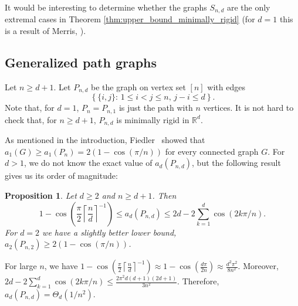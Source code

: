 \documentclass[a4paper,11pt]{article}
\theoremstyle{plain}
\newtheorem{proposition}[theorem]{\bf Proposition}
\theoremstyle{definition}
\newcommand{\Rea}{{\mathbb R}}
\newcommand{\ufrac}[2]{\left\lceil\frac{#1}{#2}\right\rceil}
\begin{document}
It would be interesting to determine whether the graphs $S_{n,d}$ are the only extremal cases in Theorem \ref{thm:upper_bound_minimally_rigid} (for $d=1$ this is a result of Merris, \cite[Cor. 2]{merris1987characteristic}).



\subsection{Generalized path graphs}\label{subsec:GeneralizedPathGraphs}

Let $n\geq d+1$. Let $P_{n,d}$ be the graph on vertex set $[n]$ with edges \[\left\{ \{i,j\} :\,1\leq i<j\leq n,\,  j-i\leq d\right\}.\] Note that, for $d=1$, $P_n=P_{n,1}$ is just the path with $n$ vertices.
It is not hard to check that, for $n\geq d+1$, $P_{n,d}$ is minimally rigid in $\Rea^d$.

As mentioned in the introduction, Fiedler~\cite{fiedler1973algebraic} showed that $a_1(G)\geq a_1(P_n)=2(1-\cos(\pi/n))$ for every connected graph $G$.
For $d>1$, we do not know the exact value of $a_d(P_{n,d})$, but the following result gives us its order of magnitude:

\begin{proposition}\label{prop:generalized_path_graph}
Let $d\geq 2$ and $n\geq d+1$. Then
\[
    1-\cos\left(\frac{\pi}{2} \ufrac{n}{d}^{-1}\right)
    \leq 
    a_d(P_{n,d})
    \leq
    2d-2\sum_{k=1}^d \cos(2k\pi/n).
\]
For $d=2$ we have a slightly better lower bound, $a_2(P_{n,2})\geq 2(1-\cos(\pi/n))$.
\end{proposition}
For large $n$, we have $1-\cos\left(\frac{\pi}{2}\ufrac{n}{d}^{-1}\right) \approx 1-\cos\left(\frac{d\pi}{2n}\right)\approx \frac{d^2 \pi^2}{8n^2}$.
Moreover, $2d-2\sum_{k=1}^d \cos(2k\pi/n)\leq \frac{2\pi^2 d(d+1)(2d+1)}{3 n^2}$.
Therefore, $a_d(P_{n,d})=\Theta_d(1/n^2)$.
\end{document}
